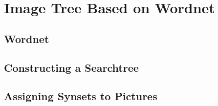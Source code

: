 %
\section{Image Tree Based on Wordnet}
\label{sec_wordnetsearchtree}

\subsection{Wordnet}


\subsection{Constructing a Searchtree}


\subsection{Assigning Synsets to Pictures}